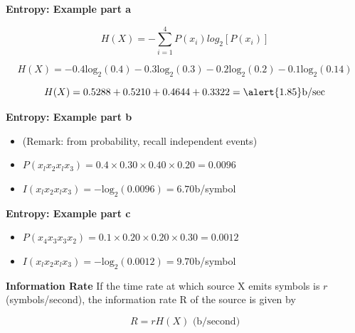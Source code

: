 \documentclass[a4]{beamer}
\begin{document}


\noindent \textbf{Entropy: Example part a}

\[ H(X) = - \sum \limits^{4}_{i=1} P(x_i) log_2 [P(x_i)] \]

\[ H(X) = -0.4\mbox{log}_2(0.4) - 0.3\mbox{log}_2(0.3)  -0.2\mbox{log}_2(0.2)  -0.1\mbox{log}_2(0.14) \]



\[ H(X) =  0.5288 + 0.5210 + 0.4644 + 0.3322  = \alert{1.85} \mbox{b/sec} \]






\noindent \textbf{Entropy: Example part b}
\begin{itemize}
\item (Remark: from probability, recall independent events) \bigskip
\item $P(x_lx_2x_lx_3) = 0.4\times 0.30 \times 0.40 \times 0.20  = 0.0096$ \bigskip
\item $I(x_lx_2x_lx_3) = -\mbox{log}_2(0.0096)  = 6.70$b/symbol \bigskip
\end{itemize}



\noindent \textbf{Entropy: Example part c}
\begin{itemize}
\item $P(x_4x_3x_3x_2) = 0.1\times 0.20 \times 0.20 \times 0.30  = 0.0012$ \bigskip
\item $I(x_lx_2x_lx_3) = -\mbox{log}_2(0.0012)  = 9.70$b/symbol \bigskip
\end{itemize}





\noindent \textbf{Information Rate}
If the time rate at which source X emits symbols is $r$ (symbols/second), the information rate R of the
source is given by

\[R = rH(X) \mbox{      (b/second)} \]
\end{document}
